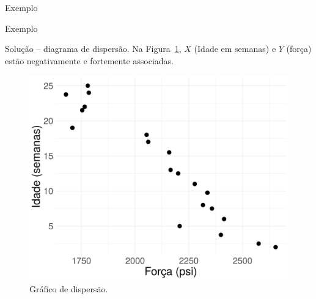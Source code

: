 \documentclass[8pt]{beamer}
\begin{document}
\begin{frame}{Exemplo}
	\begin{minipage}{0.45\linewidth}
		\begin{table}
			\centering
		\end{table}
	\end{minipage}
	
\end{frame}

\begin{frame}{Exemplo}
	
\begin{block}{Solução -- diagrama de dispersão.}
	Na Figura~\ref{fig:exemplo-regressao}, $X$ (Idade em semanas) e $Y$ (força) estão negativamente e fortemente associadas.
	\begin{figure}[htbp]
		\centering
		\caption{Gráfico de dispersão.}
		\label{fig:exemplo-regressao}
		\includegraphics[width=0.5\linewidth]{figure/dispersao.png}
	\end{figure}
\end{block}

\end{frame}
\end{document}
